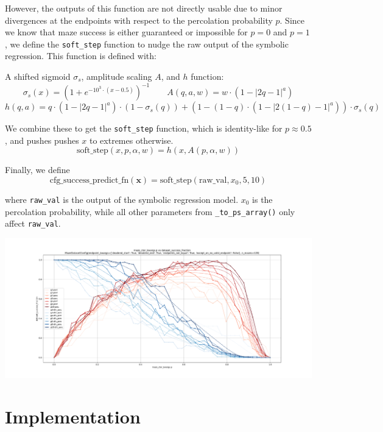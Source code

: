 \documentclass[10pt,a4paper,onecolumn]{article}
\let\origfigure\figure
\let\endorigfigure\endfigure
\renewenvironment{figure}[1][2] {
    \expandafter\origfigure\expandafter[H]
} {
    \endorigfigure
}
\begin{document}
However, the outputs of this function are not directly usable due to
minor divergences at the endpoints with respect to the percolation
probability \(p\). Since we know that maze success is either guaranteed
or impossible for \(p=0\) and \(p=1\), we define the \texttt{soft\_step}
function to nudge the raw output of the symbolic regression. This
function is defined with:

A shifted sigmoid \(\sigma_s\), amplitude scaling \(A\), and \(h\)
function: \[
  \sigma_s(x) = (1 + e^{-10^3 \cdot (x-0.5)})^{-1}
  \qquad A(q,a,w) = w \cdot (1 - |2q-1|^a)
\] \[
  h(q,a) = q \cdot (1 - |2q-1|^a) \cdot (1-\sigma_s(q)) + (1-(1-q) \cdot (1 - |2(1-q)-1|^a)) \cdot \sigma_s(q)
\]

We combine these to get the \texttt{soft\_step} function, which is
identity-like for \(p \approx 0.5\), and pushes pushes \(x\) to extremes
otherwise. \[
  \text{soft\_step}(x, p, \alpha, w) = h(x, A(p, \alpha, w))
\]

Finally, we define \[
  \text{cfg\_success\_predict\_fn}(\mathbf{x}) = \text{soft\_step}(\text{raw\_val}, x_0, 5, 10)
\]

where \texttt{raw\_val} is the output of the symbolic regression model.
\(x_0\) is the percolation probability, while all other parameters from
\texttt{\_to\_ps\_array()} only affect \texttt{raw\_val}.

\begin{figure}
\centering
\includegraphics[width=1\textwidth,height=\textheight]{figures/ep/ep_deadends_unique.pdf}
\caption{An example of both empirical and predicted success rates as a
function of the percolation probability \(p\) for various maze sizes,
percolation with and without depth first search, and
\texttt{endpoint\_kwargs} requiring that both the start and end be in
unique dead ends.}
\end{figure}

\hypertarget{implementation}{%
\section{Implementation}\label{implementation}}
\end{document}
